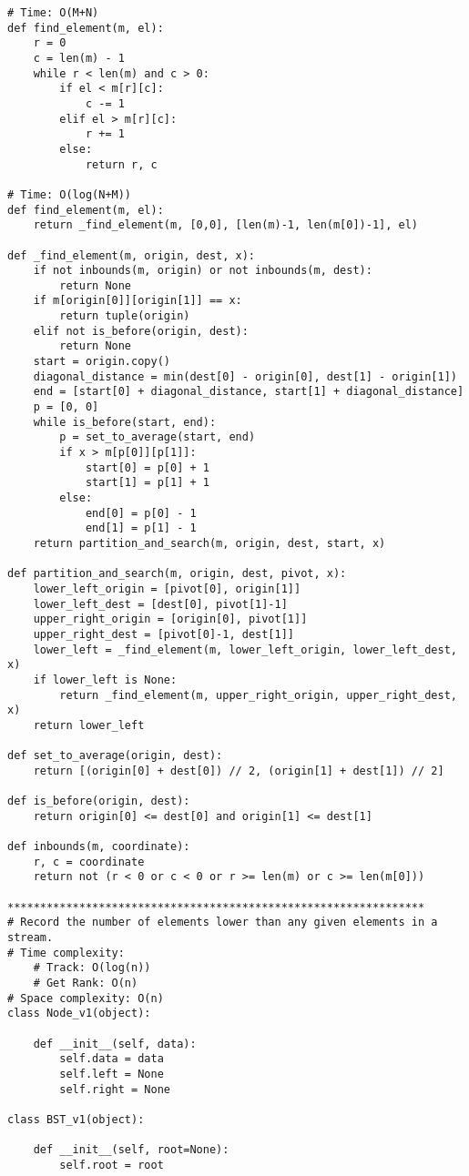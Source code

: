 \documentclass[12pt]{article}
\begin{document}
\begin{lstlisting}
# Time: O(M+N)
def find_element(m, el):
    r = 0
    c = len(m) - 1
    while r < len(m) and c > 0:
        if el < m[r][c]:
            c -= 1
        elif el > m[r][c]:
            r += 1
        else:
            return r, c

# Time: O(log(N+M))
def find_element(m, el):
    return _find_element(m, [0,0], [len(m)-1, len(m[0])-1], el)

def _find_element(m, origin, dest, x):
    if not inbounds(m, origin) or not inbounds(m, dest):
        return None
    if m[origin[0]][origin[1]] == x:
        return tuple(origin)
    elif not is_before(origin, dest):
        return None
    start = origin.copy()
    diagonal_distance = min(dest[0] - origin[0], dest[1] - origin[1])
    end = [start[0] + diagonal_distance, start[1] + diagonal_distance]
    p = [0, 0]
    while is_before(start, end):
        p = set_to_average(start, end)
        if x > m[p[0]][p[1]]:
            start[0] = p[0] + 1
            start[1] = p[1] + 1
        else:
            end[0] = p[0] - 1
            end[1] = p[1] - 1
    return partition_and_search(m, origin, dest, start, x)

def partition_and_search(m, origin, dest, pivot, x):
    lower_left_origin = [pivot[0], origin[1]]
    lower_left_dest = [dest[0], pivot[1]-1]
    upper_right_origin = [origin[0], pivot[1]]
    upper_right_dest = [pivot[0]-1, dest[1]]
    lower_left = _find_element(m, lower_left_origin, lower_left_dest, x)
    if lower_left is None:
        return _find_element(m, upper_right_origin, upper_right_dest, x)
    return lower_left

def set_to_average(origin, dest):
    return [(origin[0] + dest[0]) // 2, (origin[1] + dest[1]) // 2]

def is_before(origin, dest):
    return origin[0] <= dest[0] and origin[1] <= dest[1]

def inbounds(m, coordinate):
    r, c = coordinate
    return not (r < 0 or c < 0 or r >= len(m) or c >= len(m[0]))

****************************************************************
# Record the number of elements lower than any given elements in a stream.
# Time complexity:
    # Track: O(log(n))
    # Get Rank: O(n)
# Space complexity: O(n)
class Node_v1(object):

    def __init__(self, data):
        self.data = data
        self.left = None
        self.right = None

class BST_v1(object):

    def __init__(self, root=None):
        self.root = root


\end{lstlisting}
\end{document}
